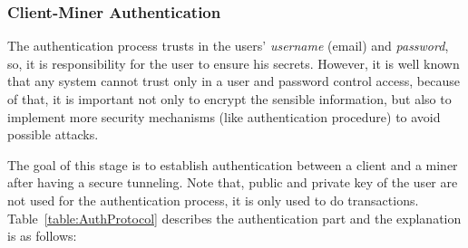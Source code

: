 



\subsubsection{Client-Miner Authentication}
\label{ssec:SecAuth}


The authentication process trusts in the users' \textit{username} 
(email) and \textit{password}, so, it is responsibility for the user 
to ensure his secrets. However, it is well known that any system 
cannot trust only in a user and password control access, because of that, 
it is important not only to encrypt the sensible information, but also
to implement more security mechanisms (like authentication procedure) to 
avoid possible attacks.

The goal of this stage is to establish authentication between a client and 
a miner after having a secure tunneling. Note that, public and private key
of the user are not used for the authentication process, it is only used to
do transactions. Table~\ref{table:AuthProtocol} 
describes the authentication part and the explanation is as follows:

